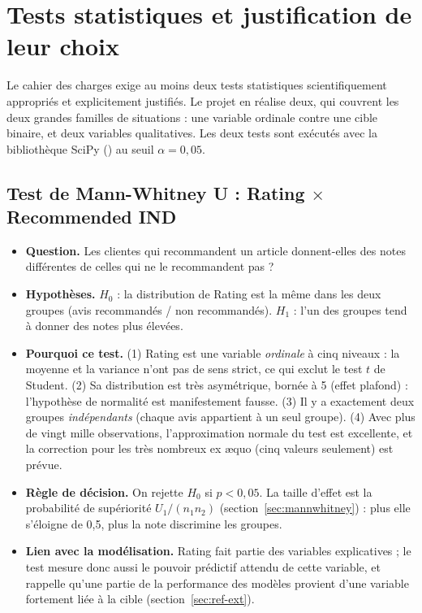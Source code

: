 \documentclass[11pt,a4paper]{report}
\makeatletter
\numberwithin{equation}{chapter}
\DeclareRobustCommand{\code}[1]{{\ttfamily\fontsize{\strip@pt\dimexpr\f@size pt*9/10\relax}{\f@baselineskip}\selectfont\detokenize{#1}}}
\makeatother
\begin{document}
\section{Tests statistiques et justification de leur choix}
Le cahier des charges exige au moins deux tests statistiques scientifiquement appropriés et explicitement justifiés. Le projet en réalise deux, qui couvrent les deux grandes familles de situations : une variable ordinale contre une cible binaire, et deux variables qualitatives. Les deux tests sont exécutés avec la bibliothèque SciPy (\code{scipy.stats}) au seuil $\alpha = 0{,}05$.

\subsection{Test de Mann-Whitney U : Rating $\times$ Recommended IND}\label{sec:mw-test}
\begin{itemize}
\item \textbf{Question.} Les clientes qui recommandent un article donnent-elles des notes différentes de celles qui ne le recommandent pas ?
\item \textbf{Hypothèses.} $H_0$ : la distribution de Rating est la même dans les deux groupes (avis recommandés / non recommandés). $H_1$ : l'un des groupes tend à donner des notes plus élevées.
\item \textbf{Pourquoi ce test.} (1) Rating est une variable \textit{ordinale} à cinq niveaux : la moyenne et la variance n'ont pas de sens strict, ce qui exclut le test $t$ de Student. (2) Sa distribution est très asymétrique, bornée à 5 (effet plafond) : l'hypothèse de normalité est manifestement fausse. (3) Il y a exactement deux groupes \textit{indépendants} (chaque avis appartient à un seul groupe). (4) Avec plus de vingt mille observations, l'approximation normale du test est excellente, et la correction pour les très nombreux ex æquo (cinq valeurs seulement) est prévue.
\item \textbf{Règle de décision.} On rejette $H_0$ si $p < 0{,}05$. La taille d'effet est la probabilité de supériorité $U_1/(n_1 n_2)$ (section~\ref{sec:mannwhitney}) : plus elle s'éloigne de 0,5, plus la note discrimine les groupes.
\item \textbf{Lien avec la modélisation.} Rating fait partie des variables explicatives ; le test mesure donc aussi le pouvoir prédictif attendu de cette variable, et rappelle qu'une partie de la performance des modèles provient d'une variable fortement liée à la cible (section~\ref{sec:ref-ext}).
\end{itemize}
\end{document}
